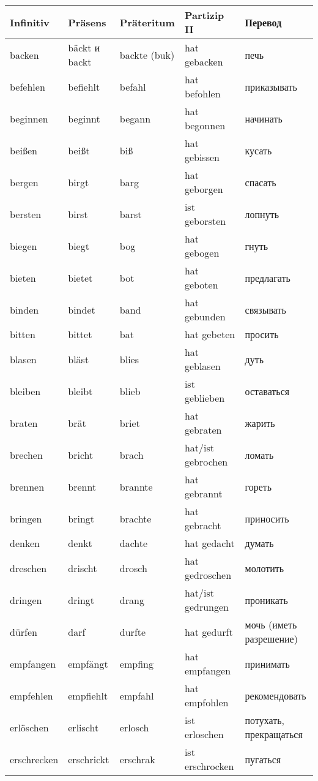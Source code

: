 
\begin{longtable}{|l|l|l|l|l|}
\hline
Infinitiv & Pr\"asens & Pr\"ateritum & Partizip II & Перевод \\
\hline\endhead
backen & b\"ackt и backt & backte (buk) & hat gebacken & печь \\
befehlen & befiehlt & befahl & hat befohlen & приказывать \\
beginnen & beginnt & begann & hat begonnen & начинать \\
bei\ss en & bei\ss t & bi\ss  & hat gebissen & кусать \\
bergen & birgt & barg & hat geborgen & спасать \\
bersten & birst & barst & ist geborsten & лопнуть \\
biegen & biegt & bog & hat gebogen & гнуть \\
bieten & bietet & bot & hat geboten & предлагать \\
binden & bindet & band & hat gebunden & связывать \\
bitten & bittet & bat & hat gebeten & просить \\
blasen & bl\"ast & blies & hat geblasen & дуть \\
bleiben & bleibt & blieb & ist geblieben & оставаться  \\
braten & br\"at & briet & hat gebraten & жарить \\
brechen & bricht & brach & hat/ist gebrochen & ломать \\
brennen & brennt & brannte & hat gebrannt & гореть \\
bringen & bringt & brachte & hat gebracht & приносить  \\
denken & denkt & dachte & hat gedacht & думать \\
dreschen & drischt & drosch & hat gedroschen & молотить \\
dringen & dringt & drang & hat/ist gedrungen & проникать \\
d\"urfen & darf & durfte & hat gedurft & мочь (иметь разрешение) \\
empfangen & empf\"angt & empfing & hat empfangen & принимать \\
empfehlen & empfiehlt & empfahl & hat empfohlen & рекомендовать \\
erl\"oschen & erlischt & erlosch & ist erloschen & потухать, прекращаться \\
erschrecken & erschrickt & erschrak & ist erschrocken & пугаться \\

\end{longtable}
